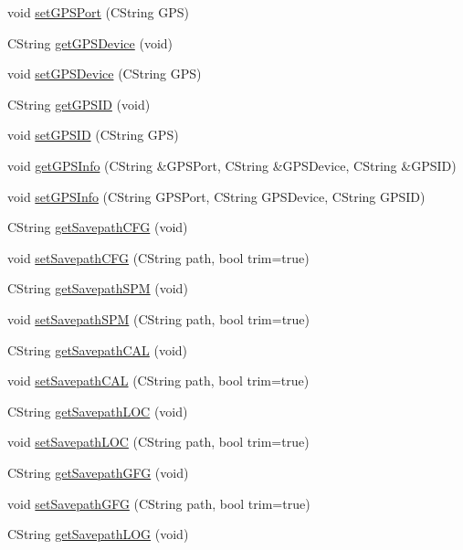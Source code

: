 \begin{DoxyCompactItemize}
void \hyperlink{classCspec4Cfg_a1ea8e595d812d0002cd90cda16705a87}{setGPSPort} (CString GPS)
\item 
CString \hyperlink{classCspec4Cfg_ad30dc7ef8c9fa8b161cbfebe886294f3}{getGPSDevice} (void)
\item 
void \hyperlink{classCspec4Cfg_af672b2f0fdbc6fd9a234c65b04415b82}{setGPSDevice} (CString GPS)
\item 
CString \hyperlink{classCspec4Cfg_ac3f72ea8e1a2a560e936d5ca61d9e78f}{getGPSID} (void)
\item 
void \hyperlink{classCspec4Cfg_acf0981a73ca62acaf9175d929ad017a1}{setGPSID} (CString GPS)
\item 
void \hyperlink{classCspec4Cfg_a8d3f9c063c5abfbb75db58be98a0464d}{getGPSInfo} (CString \&GPSPort, CString \&GPSDevice, CString \&GPSID)
\item 
void \hyperlink{classCspec4Cfg_a61d7e12c20faaedee991069f5b6ba6dc}{setGPSInfo} (CString GPSPort, CString GPSDevice, CString GPSID)
\item 
CString \hyperlink{classCspec4Cfg_a6c60e8f04d97e3bc6b1a9fbfea8d4a71}{getSavepathCFG} (void)
\item 
void \hyperlink{classCspec4Cfg_a9c90d3a0c33f794a6db9fcff4e86376f}{setSavepathCFG} (CString path, bool trim=true)
\item 
CString \hyperlink{classCspec4Cfg_afdfee7f6dcf930bec209dbd85c265980}{getSavepathSPM} (void)
\item 
void \hyperlink{classCspec4Cfg_a97a65045f29a2cae6b49a03588b0e0b0}{setSavepathSPM} (CString path, bool trim=true)
\item 
CString \hyperlink{classCspec4Cfg_a84adf44b0d5cec748f43bfc1fc3e2951}{getSavepathCAL} (void)
\item 
void \hyperlink{classCspec4Cfg_a24998c17dfa9e535d37117b39b10f21f}{setSavepathCAL} (CString path, bool trim=true)
\item 
CString \hyperlink{classCspec4Cfg_a29e1b514017e9f9a2522a592163dd99b}{getSavepathLOC} (void)
\item 
void \hyperlink{classCspec4Cfg_a705847afcd4e981d774376fd06da660e}{setSavepathLOC} (CString path, bool trim=true)
\item 
CString \hyperlink{classCspec4Cfg_ae86036ffbc5dc2c3741d0160845598be}{getSavepathGFG} (void)
\item 
void \hyperlink{classCspec4Cfg_a6771e799201cdcdf25ffe80df78803d5}{setSavepathGFG} (CString path, bool trim=true)
\item 
CString \hyperlink{classCspec4Cfg_a7ae95a75f9e3b195e4a00a094a70d791}{getSavepathLOG} (void)

\end{DoxyCompactItemize}
